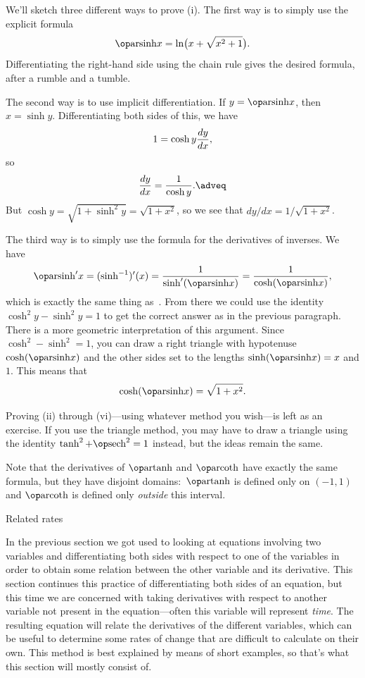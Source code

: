 \proof We'll sketch three different ways to prove (i). The first way is to simply use the explicit formula
$$\arsinh x = \ln\bigl( x + \sqrt{x^2+1}\bigr).$$
Differentiating the right-hand side using the chain rule gives the desired formula, after a rumble and a tumble.

The second way is to use implicit differentiation. If $y=\arsinh x$, then $x = \sinh y$. Differentiating
both sides of this, we have
$$1 = \cosh y {dy\over dx},$$
so
\edef\eqarsinh{\the\eqcount}
$${dy\over dx} = {1\over \cosh y}.\adveq$$
But $\cosh y = \sqrt{1+\sinh^2 y} = \sqrt{1+x^2}$, so we see that $dy/dx = 1/\sqrt{1+x^2}$.

The third way is to simply use the formula for the derivatives of inverses. We have
$$\arsinh' x = (\sinh^{-1})'(x) = {1\over \sinh'(\arsinh x)} = {1\over \cosh(\arsinh x)},$$
which is exactly the same thing as~\refeq{\eqarsinh}. From there we could use the identity
$\cosh^2 y - \sinh^2 y = 1$ to get the correct answer as in the previous paragraph. There is a more
geometric interpretation of this argument. Since $\cosh^2  - \sinh^2 = 1$, you can draw a right triangle
with hypotenuse $\cosh (\arsinh x)$ and the other sides set to the lengths $\sinh (\arsinh x) = x$ and $1$.
This means that
$$\cosh (\arsinh x) = \sqrt{1+x^2}.$$

Proving (ii) through (vi)---using whatever method you wish---is left as an exercise.
If you use the triangle method, you may have to draw a triangle using the identity $\tanh^2 + \sech^2 = 1$
instead, but the ideas remain the same.
\slug

Note that the derivatives of $\artanh$ and $\arcoth$ have exactly the same formula, but they have disjoint
domains:~$\artanh$ is defined only on $(-1,1)$ and $\arcoth$ is defined only {\it outside} this interval.

\advsect Related rates

In the previous section we got used to looking at equations involving two variables and differentiating
both sides with respect to one of the variables in order to obtain some relation between the other variable
and its derivative.
This section continues this practice of differentiating both sides of an equation, but this time
we are concerned with taking derivatives
with respect to another variable not present in the equation---often this variable will represent {\it time}.
The resulting equation will relate the derivatives of the different variables, which can be useful to
determine some rates of change that are difficult to calculate on their own. This method is best explained
by means of short examples, so that's what this section will mostly consist of.

